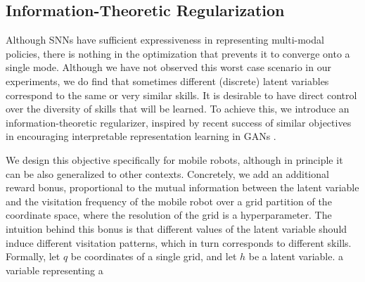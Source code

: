 \documentclass{article} %
\begin{document}



\subsection{Information-Theoretic Regularization}
\label{section:method:inforeg}

Although SNNs have sufficient expressiveness in representing multi-modal policies, there is nothing in the optimization that prevents it to converge onto a single mode. Although we have not observed this worst case scenario in our experiments, we do find that sometimes different (discrete) latent variables correspond to the same or very similar skills. It is desirable to have direct control over the diversity of skills that will be learned. To achieve this, we introduce an information-theoretic regularizer, inspired by recent success of similar objectives in encouraging interpretable representation learning in GANs \citep{chen2016infogan}.

We design this objective specifically for mobile robots, although in principle it can be also generalized to other contexts.
Concretely, we add an additional reward bonus, proportional to the mutual information between the latent variable and the visitation frequency of the mobile robot over a grid partition of the coordinate space, where the resolution of the grid is a hyperparameter. The intuition behind this bonus is that different values of the latent variable should induce different visitation patterns, which in turn corresponds to different skills. Formally, let $q$ be coordinates of a single grid, and let $h$ be a latent variable. a variable representing a %

\end{document}
